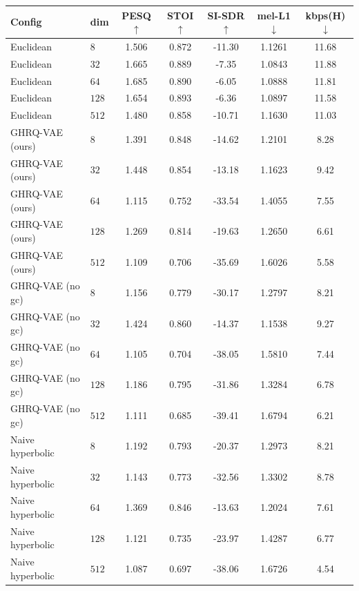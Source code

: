 \begin{tabular}{llccccc}
\hline
Config & dim & PESQ$\uparrow$ & STOI$\uparrow$ & SI-SDR$\uparrow$ & mel-L1$\downarrow$ & kbps(H)$\downarrow$ \\
\hline
Euclidean & $8$ & 1.506 & 0.872 & -11.30 & 1.1261 & 11.68 \\
Euclidean & $32$ & 1.665 & 0.889 & -7.35 & 1.0843 & 11.88 \\
Euclidean & $64$ & 1.685 & 0.890 & -6.05 & 1.0888 & 11.81 \\
Euclidean & $128$ & 1.654 & 0.893 & -6.36 & 1.0897 & 11.58 \\
Euclidean & $512$ & 1.480 & 0.858 & -10.71 & 1.1630 & 11.03 \\
\hline
GHRQ-VAE (ours) & $8$ & 1.391 & 0.848 & -14.62 & 1.2101 & 8.28 \\
GHRQ-VAE (ours) & $32$ & 1.448 & 0.854 & -13.18 & 1.1623 & 9.42 \\
GHRQ-VAE (ours) & $64$ & 1.115 & 0.752 & -33.54 & 1.4055 & 7.55 \\
GHRQ-VAE (ours) & $128$ & 1.269 & 0.814 & -19.63 & 1.2650 & 6.61 \\
GHRQ-VAE (ours) & $512$ & 1.109 & 0.706 & -35.69 & 1.6026 & 5.58 \\
\hline
GHRQ-VAE (no gc) & $8$ & 1.156 & 0.779 & -30.17 & 1.2797 & 8.21 \\
GHRQ-VAE (no gc) & $32$ & 1.424 & 0.860 & -14.37 & 1.1538 & 9.27 \\
GHRQ-VAE (no gc) & $64$ & 1.105 & 0.704 & -38.05 & 1.5810 & 7.44 \\
GHRQ-VAE (no gc) & $128$ & 1.186 & 0.795 & -31.86 & 1.3284 & 6.78 \\
GHRQ-VAE (no gc) & $512$ & 1.111 & 0.685 & -39.41 & 1.6794 & 6.21 \\
\hline
Naive hyperbolic & $8$ & 1.192 & 0.793 & -20.37 & 1.2973 & 8.21 \\
Naive hyperbolic & $32$ & 1.143 & 0.773 & -32.56 & 1.3302 & 8.78 \\
Naive hyperbolic & $64$ & 1.369 & 0.846 & -13.63 & 1.2024 & 7.61 \\
Naive hyperbolic & $128$ & 1.121 & 0.735 & -23.97 & 1.4287 & 6.77 \\
Naive hyperbolic & $512$ & 1.087 & 0.697 & -38.06 & 1.6726 & 4.54 \\
\hline
\end{tabular}
